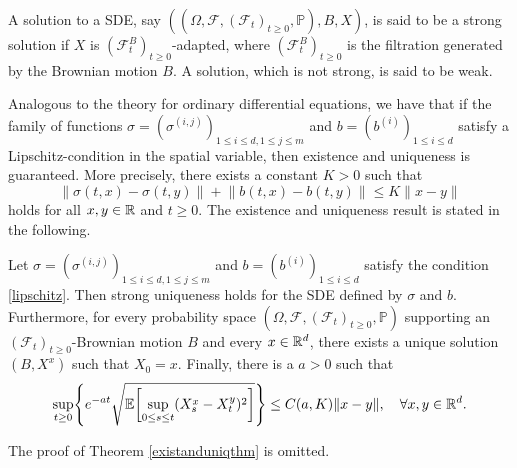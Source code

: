A solution to a SDE, say $\left((\Omega,\mathcal{F},(\mathcal{F}_{t})_{t\geq 0},\mathbb{P}),B,X\right)$, is said to be a strong solution if $X$ is $(\mathcal{F}_{t}^{B})_{t\geq 0}$-adapted, where $(\mathcal{F}_{t}^{B})_{t\geq 0}$ is the filtration generated by the Brownian motion $B$.
A solution, which is not strong, is said to be weak. 

Analogous to the theory for ordinary differential equations, we have that if the family of functions $\sigma=(\sigma^{(i,j)})_{1\leq i\leq d, 1\leq j\leq m}$ and $b=(b^{(i)})_{1\leq i\leq d}$ satisfy a Lipschitz-condition in the spatial variable, then existence and uniqueness is guaranteed. More precisely, there exists a constant $K>0$ such that
\begin{equation}\label{lipschitz}
    \lVert \sigma(t,x)-\sigma(t,y)\rVert+ \lVert b(t,x)-b(t,y)\rVert \leq K\lVert x-y\rVert
\end{equation}
holds for all $x,y\in\mathbb{R}$ and $t\geq 0$. The existence and uniqueness result is stated in the following.
\begin{thm}\label{existanduniqthm} Let $\sigma=(\sigma^{(i,j)})_{1\leq i\leq d, 1\leq j\leq m}$ and $b=(b^{(i)})_{1\leq i\leq d}$ satisfy the condition \eqref{lipschitz}. Then strong uniqueness holds for the SDE defined by $\sigma$ and $b$. Furthermore, for every probability space $(\Omega,\mathcal{F},(\mathcal{F}_{t})_{t\geq 0},\mathbb{P})$ supporting an $(\mathcal{F}_{t})_{t\geq 0}$-Brownian motion $B$ and every $x\in \mathbb{R}^d$, there exists a unique solution $(B,X^{x})$ such that $X_{0}=x$. Finally, there is a $a>0$ such that
\begin{equation}
    \sup_{t\geq 0}\left\{e^{-at}\sqrt{\mathbb{E}\left[\sup_{0\leq s\leq t}(X_{s}^{x}-X_{t}^{y})^{2}\right]}\right\}\leq C(a,K)\lVert x-y\rVert, \quad \forall x,y\in\R^{d}.
\end{equation}
\end{thm}
The proof of Theorem \ref{existanduniqthm} is omitted.
